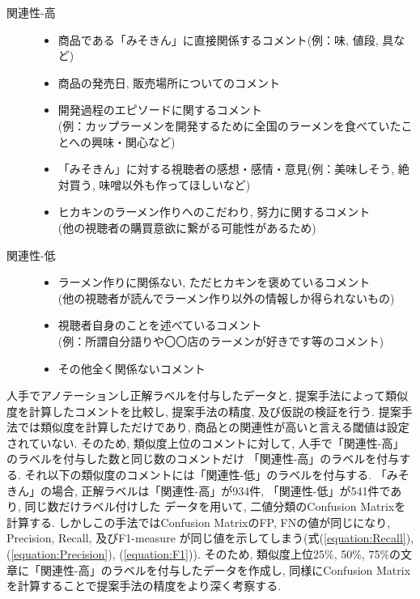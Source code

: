 \documentclass{ltjarticle}
\begin{document}
\begin{description}
    \item[関連性-高]\mbox{}
    \begin{itemize}
        \item 商品である「みそきん」に直接関係するコメント(例：味, 値段, 具など)
        \item 商品の発売日, 販売場所についてのコメント
        \item 開発過程のエピソードに関するコメント\\(例：カップラーメンを開発するために全国のラーメンを食べていたことへの興味・関心など)
        \item 「みそきん」に対する視聴者の感想・感情・意見(例：美味しそう, 絶対買う, 味噌以外も作ってほしいなど)
        \item ヒカキンのラーメン作りへのこだわり, 努力に関するコメント\\(他の視聴者の購買意欲に繋がる可能性があるため) 
    \end{itemize}
    \item[関連性-低] \mbox{}
    \begin{itemize}
        \item ラーメン作りに関係ない, ただヒカキンを褒めているコメント\\(他の視聴者が読んでラーメン作り以外の情報しか得られないもの)
        \item 視聴者自身のことを述べているコメント\\(例：所謂自分語りや〇〇店のラーメンが好きです等のコメント)
        \item その他全く関係ないコメント
    \end{itemize}
\end{description}
\vspace{10truept}

人手でアノテーションし正解ラベルを付与したデータと, 提案手法によって類似度を計算したコメントを比較し, 
提案手法の精度, 及び仮説の検証を行う. 
提案手法では類似度を計算しただけであり, 商品との関連性が高いと言える閾値は設定されていない. 
そのため, 類似度上位のコメントに対して, 人手で「関連性-高」のラベルを付与した数と同じ数のコメントだけ
「関連性-高」のラベルを付与する. 
それ以下の類似度のコメントには「関連性-低」のラベルを付与する. 
「みそきん」の場合, 正解ラベルは「関連性-高」が934件, 「関連性-低」が541件であり, 同じ数だけラベル付けした
データを用いて, 二値分類のConfusion Matrixを計算する. 
しかしこの手法ではConfusion MatrixのFP, FNの値が同じになり, Precision, Recall, 及びF1-measure
が同じ値を示してしまう(式(\ref{equation:Recall}), (\ref{equation:Precision}), (\ref{equation:F1})). 
そのため, 類似度上位25\%, 50\%, 75\%の文章に「関連性-高」のラベルを付与したデータを作成し, 同様にConfusion Matrix
を計算することで提案手法の精度をより深く考察する. 
\end{document}

